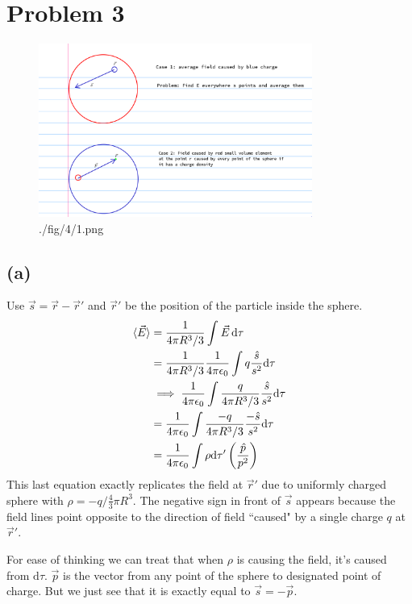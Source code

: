 \documentclass[letter, 10pts]{article}
\begin{document}
\section*{Problem 3} 
\begin{figure}[H]
	\centering
	\includegraphics[width=0.8\textwidth]{./fig/4/1.png}
	\caption{./fig/4/1.png}
	\label{fig:-fig-4-1-png}
\end{figure}
\subsection*{(a)}
Use $\vec{s} = \vec{r} - \vec{r}'$ and $\vec{r}'$ be the position of the particle inside the sphere. 
\begin{align*}
\braket{ \vec{E}} &= \frac{1}{4  \pi R^3 / 3} \int_{}^{} \vec{E} \, \mathrm{d} \tau  \\
&= \frac{1}{4 \pi R^3 / 3} \frac{1}{4 \pi \epsilon_0} \int q \frac{\hat{s}}{s ^2} \mathrm{d} \tau \\
&\implies 
\frac{1}{4 \pi \epsilon_0} \int \frac{q}{4 \pi R^3 / 3} \frac{\hat{s}}{s ^2} \mathrm{d} \tau \\
&= \frac{1}{4 \pi \epsilon_0} \int \frac{- q}{4 \pi R^3 / 3} \frac{-\hat{s}}{s ^2} \mathrm{d} \tau \\
&= \frac{1}{4 \pi \epsilon_0} \int \rho \mathrm{d} \tau' \left(\frac{\hat{p}}{p^2}\right) \\
\end{align*}
This last equation exactly replicates the field at $\vec{r}'$ due to uniformly charged sphere with $\rho = - q / \frac{4}{3} \pi R^3$. The negative sign in front of $\vec{s}$ appears because the field lines point opposite to the direction of field ``caused" by a single charge $q$ at $\vec{r}'$.

For ease of thinking we can treat that when $\rho$ is causing the field, it's caused from $\mathrm{d}  \tau$. $\vec{p}$ is the vector from any point of the sphere to designated point of charge. But we just see that it is exactly equal to $\vec{s} = - \vec{p}$.
\end{document}
